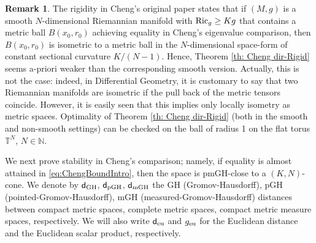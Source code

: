 \documentclass[12pt]{article}
\newcommand{\Ric}{{\rm Ric}}
\newcommand{\sfd}{\mathsf d}
\theoremstyle{plain}
\theoremstyle{definition}
\newtheorem{remark}[lemma]{Remark}
\begin{document}
\begin{remark}
The rigidity in Cheng's original paper \cite{cheng-bound} states that if $(M,g)$ is a smooth $N$-dimensional Riemannian manifold with $\Ric_g\geq K g$ that contains a metric ball $B(x_0, r_0)$ achieving equality in Cheng's eigenvalue comparison,  then $B(x_0, r_0)$ is isometric to a metric ball in the $N$-dimensional space-form of constant sectional curvature $K/(N-1)$. Hence, Theorem \ref{th: Cheng dir-Rigid} seems a-priori weaker than the corresponding smooth version. Actually, this is not the case: indeed, in Differential Geometry, it is customary to say that two
Riemannian manifolds are isometric if the pull back of the metric tensors coincide.
However, it is easily seen that this implies only locally isometry as metric spaces.
Optimality of Theorem \ref{th: Cheng dir-Rigid}  (both in the smooth and non-smooth settings) can
be checked on the ball of radius 1 on the flat torus $\mathbb{T}^N$, $N\in \mathbb{N}$.
\end{remark}

We next prove stability in Cheng's comparison; namely, if equality is almost attained in \eqref{eq:ChengBoundIntro}, then the space is pmGH-close to a $(K,N)$-cone.  We denote by $\sfd_{\rm GH }$, $\sfd_{\rm pGH }$, $\sfd_{\rm mGH }$ the GH (Gromov-Hausdorff), pGH (pointed-Gromov-Hausdorff), mGH (measured-Gromov-Hausdorff) distances between compact metric spaces, complete metric spaces, compact metric measure spaces, respectively. We will also write $\sfd_{\rm eu}$ and  $g_{\rm eu}$ for the Euclidean distance and the Euclidean scalar product, respectively.
\end{document}
